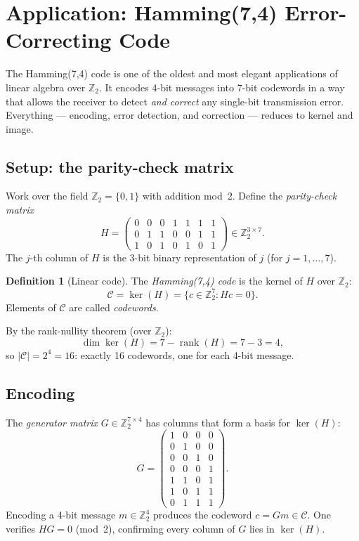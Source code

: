 \documentclass[11pt]{article}
\theoremstyle{definition}
\newtheorem{definition}{Definition}[section]
\theoremstyle{plain}
\begin{document}
\section{Application: Hamming(7,4) Error-Correcting Code}

The Hamming(7,4) code is one of the oldest and most elegant applications
of linear algebra over $\mathbb{Z}_2$.  It encodes 4-bit messages into
7-bit codewords in a way that allows the receiver to detect \emph{and
correct} any single-bit transmission error.  Everything --- encoding,
error detection, and correction --- reduces to kernel and image.

\subsection{Setup: the parity-check matrix}

Work over the field $\mathbb{Z}_2 = \{0,1\}$ with addition mod~2.
Define the \emph{parity-check matrix}
\[
  H = \begin{pmatrix}
    0&0&0&1&1&1&1\\
    0&1&1&0&0&1&1\\
    1&0&1&0&1&0&1
  \end{pmatrix} \in \mathbb{Z}_2^{3\times 7}.
\]
The $j$-th column of $H$ is the 3-bit binary representation of $j$
(for $j=1,\ldots,7$).

\begin{definition}[Linear code]
  The \emph{Hamming(7,4) code} is the kernel of $H$ over $\mathbb{Z}_2$:
  \[
    \mathcal{C} = \ker(H) = \{c\in\mathbb{Z}_2^7 : Hc = 0\}.
  \]
  Elements of $\mathcal{C}$ are called \emph{codewords}.
\end{definition}

By the rank-nullity theorem (over $\mathbb{Z}_2$):
\[
  \dim\ker(H) = 7 - \operatorname{rank}(H) = 7 - 3 = 4,
\]
so $|\mathcal{C}| = 2^4 = 16$: exactly 16 codewords, one for each
4-bit message.

\subsection{Encoding}

The \emph{generator matrix} $G\in\mathbb{Z}_2^{7\times 4}$ has columns
that form a basis for $\ker(H)$:
\[
  G = \begin{pmatrix}
    1&0&0&0\\
    0&1&0&0\\
    0&0&1&0\\
    0&0&0&1\\
    1&1&0&1\\
    1&0&1&1\\
    0&1&1&1
  \end{pmatrix}.
\]
Encoding a 4-bit message $m\in\mathbb{Z}_2^4$ produces the codeword
$c = Gm \in \mathcal{C}$.  One verifies $HG = 0$ (mod~2), confirming
every column of $G$ lies in $\ker(H)$.
\end{document}
